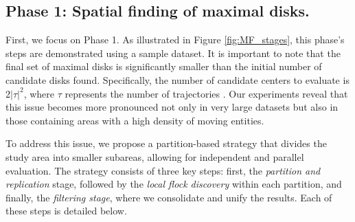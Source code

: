 \subsection{Phase 1: Spatial finding of maximal disks.}
First, we focus on Phase 1. As illustrated in Figure \ref{fig:MF_stages}, this phase's steps are demonstrated using a sample dataset. It is important to note 
that the final set of maximal disks is significantly smaller than the initial number of candidate disks found. Specifically, the number of candidate centers to 
evaluate is $2\lvert\tau\rvert^2$, where $\tau$ represents the number of trajectories \cite{vieira_2009}. Our experiments reveal that this issue becomes more 
pronounced not only in very large datasets but also in those containing areas with a high density of moving entities.

To address this issue, we propose a partition-based strategy that divides the study area into smaller subareas, allowing for independent and parallel 
evaluation. The strategy consists of three key steps: first, the \textit{partition and replication} stage, followed by the \textit{local flock discovery} within 
each partition, and finally, the \textit{filtering stage}, where we consolidate and unify the results. Each of these steps is detailed below.

